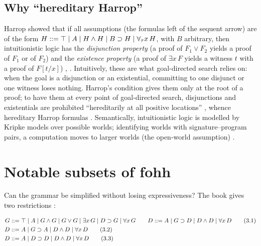 {{\subsection{Why ``hereditary Harrop''}

Harrop showed that if all assumptions (the formulas left of the sequent arrow) are of the form
$H::=\top\mid A\mid H\wedge H\mid B\supset H\mid\forall_\tau x\,H$, with $B$ arbitrary, then intuitionistic
logic has the \emph{disjunction property} (a proof of $F_1\vee F_2$ yields a proof of $F_1$ or of $F_2$)
and the \emph{existence property} (a proof of $\exists x\,F$ yields a witness $t$ with a proof of
$F[t/x]$) \cite{Harrop1960}, . Intuitively, these are what goal-directed search relies on: when
the goal is a disjunction or an existential, committing to one disjunct or one witness loses nothing. Harrop's condition
gives them only at the root of a proof; to have them at every point of goal-directed search, disjunctions and existentials
are prohibited ``hereditarily at all positive locations'' , whence hereditary Harrop formulas
\cite{MillerNadathurPfenningScedrov1991}. Semantically, intuitionistic logic is modelled by Kripke models
over possible worlds; identifying worlds with signature--program pairs, a \fohh{} computation moves to larger
worlds (the open-world assumption) .

\section{Notable subsets of fohh}\label{sec:hh-subsets}

Can the grammar be simplified without losing expressiveness? The book gives two restrictions :
\begin{fullwidth}
\begin{align}
G &::= \top \mid A \mid G\wedge G \mid G\vee G \mid \exists x\,G \mid D\supset G \mid \forall x\,G
\qquad D ::= A \mid G\supset D \mid D\wedge D \mid \forall x\,D \tag{3.1}\\
D &::= A \mid G\supset A \mid D\wedge D \mid \forall x\,D \tag{3.2}\\
D &::= A \mid D\supset D \mid D\wedge D \mid \forall x\,D \tag{3.3}
\end{align}
\end{fullwidth}

}}
